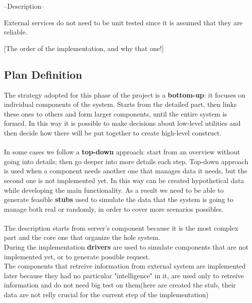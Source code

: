 --Description--

External services do not need to be unit tested since it is assumed that they are reliable. 

[The order of the implementation, and why that one!]


\subsection{Plan Definition}
The strategy adopted for this phase of the project is a \textbf{bottom-up}: it focuses on individual components of the system. 
Starts from the detailed part, then links these ones to others and form larger components, until the entire system is formed. In this way it is possible to make decisions about low-level utilities and then decide how there will be put together to create high-level construct.\\ \\
In some cases we follow a \textbf{top-down} approach: start from an overview without going into details; then go deeper into more details each step. Top-down approach is used when a component needs another one that manages data it needs, but the second one is not implemented yet. In this way can be created hypothetical data while developing the main functionality. As a result we need to be able to generate feasible \textbf{stubs} used to simulate the data that the system is going to manage both real or randomly, in order to cover more scenarios possibles.\\ \\
The description starts from server's component because it is the most complex part and the core one that organize the hole system.\\
During the implementation \textbf{drivers} are used to simulate components that are not implemented yet, or to generate possible request.\\
The components that retreive information from external system are implemented later because they had no particular "intelligence" in it, are used only to retreive information and do not need big test on them(here are created the stub, their data are not relly crucial for the current step of the implementation) 

